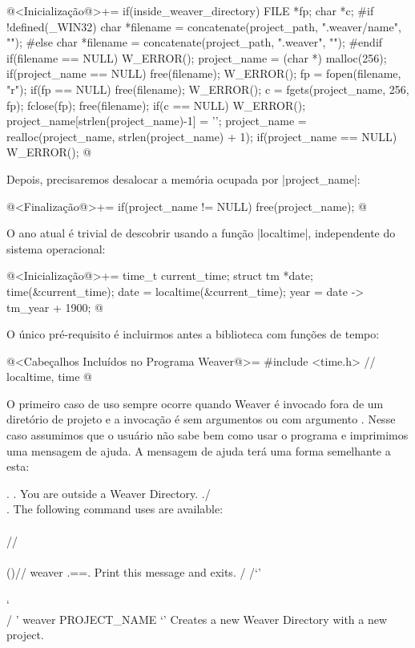 {\iniciocodigo
@<Inicialização@>+=
if(inside_weaver_directory){
  FILE *fp;
  char *c;
#if !defined(_WIN32)
  char *filename = concatenate(project_path, ".weaver/name", "");
#else
  char *filename = concatenate(project_path, ".weaver\name", "");
#endif
  if(filename == NULL) W_ERROR();
  project_name = (char *) malloc(256);
  if(project_name == NULL){
    free(filename);
    W_ERROR();
  }
  fp = fopen(filename, "r");
  if(fp == NULL){
    free(filename);
    W_ERROR();
  }
  c = fgets(project_name, 256, fp);
  fclose(fp);
  free(filename);
  if(c == NULL) W_ERROR();
  project_name[strlen(project_name)-1] = '\0';
  project_name = realloc(project_name, strlen(project_name) + 1);
  if(project_name == NULL) W_ERROR();
}
@
\fimcodigo

Depois, precisaremos desalocar a memória ocupada por |project_name|:

\iniciocodigo
@<Finalização@>+=
if(project_name != NULL) free(project_name);
@
\fimcodigo


O ano atual é trivial de descobrir usando a função |localtime|,
independente do sistema operacional:

\iniciocodigo
@<Inicialização@>+=
{
  time_t current_time;
  struct tm *date;
  time(&current_time);
  date = localtime(&current_time);
  year = date -> tm_year + 1900;
}
@
\fimcodigo

O único pré-requisito é incluirmos antes a biblioteca com funções de
tempo:

\iniciocodigo
@<Cabeçalhos Incluídos no Programa Weaver@>=
#include <time.h> // localtime, time
@
\fimcodigo



O primeiro caso de uso sempre ocorre quando Weaver é invocado fora de
um diretório de projeto e a invocação é sem argumentos ou com
argumento . Nesse caso assumimos que o usuário não sabe
bem como usar o programa e imprimimos uma mensagem de ajuda. A mensagem
de ajuda terá uma forma semelhante a esta:

\alinhaverbatim
    .  .   You are outside a Weaver Directory.
   ./  \\.  The following command uses are available:
   \\\\  //
   \\\\()//  weaver
   .={}=.      Print this message and exits.
  / /`'\\ \\
  ` \\  / '  weaver PROJECT_NAME
     `'        Creates a new Weaver Directory with a new
               project.
\alinhanormal

}
